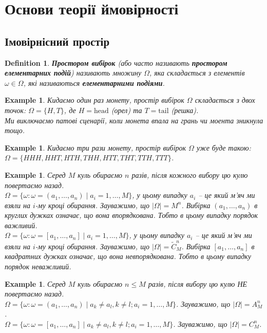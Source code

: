 \documentclass[a4paper, 10pt]{article}
\theoremstyle{theoremdd}
\newtheorem{definition}[theorem]{Definition}
\newtheorem{example}[theorem]{Example}
\begin{document}
%
\tableofcontents
\newpage
    	
\section{Основи теорії ймовірності}
\subsection{Імовірнісний простір}
\begin{definition}
\textbf{Простором вибірок} (або часто називають \textbf{простором елементарних подій}) називають множину $\Omega$, яка складається з елементів $\omega \in \Omega$, які називаються \textbf{елементарними подіями}.
\end{definition}

\begin{example}
Кидаємо один раз монету, простір вибірок $\Omega$ складається з двох точок: $\Omega = \{H, T\}$, де $H = \text{head}$ (орел) та $T = \text{tail}$ (решка). \\
Ми виключаємо патові сценарії, коли монета впала на грань чи моента зникнула тощо.
\end{example}

\begin{example}
Кидаємо три рази монету, простір вибірок $\Omega$ уже буде такою:\\
$\Omega = \{ HHH, HHT, HTH, THH, HTT, THT, TTH, TTT \}$.
\end{example}

\begin{example}
Серед $M$ куль обираємо $n$ разів, після кожного вибору цю кулю повертаємо назад.\\
$\Omega = \{\omega : \omega = (a_1,\dots,a_n) \mid a_i = 1,\dots,M\}$, у цьому випадку $a_i$ -- це який м'яч ми взяли на $i$-му кроці обирання. Зауважимо, що $|\Omega| = M^n$. Вибірка $(a_1,\dots,a_n)$ в круглих дужках означає, що вона впорядкована. Тобто в цьому випадку порядок важливий.\\
$\Omega = \{\omega : \omega = [a_1,\dots,a_n] \mid a_i = 1,\dots,M\}$, у цьому випадку $a_i$ -- це який м'яч ми взяли на $i$-му кроці обирання. Зауважимо, що $|\Omega| = \widetilde{C}_M^n$. Вибірка $[a_1,\dots,a_n]$ в квадратних дужках означає, що вона невпорядкована. Тобто в цьому випадку порядок неважливий.
\end{example}

\begin{example}
Серед $M$ куль обираємо $n \leq M$ разів, після вибору цю кулю НЕ повертаємо назад.\\
$\Omega = \{\omega : \omega = (a_1,\dots,a_n) \mid a_k \neq a_l, k \neq l; a_i = 1,\dots,M\}$. Зауважимо, що $|\Omega| = A_M^n$.\\
$\Omega = \{\omega : \omega = [a_1,\dots,a_n] \mid a_k \neq a_l, k \neq l; a_i = 1,\dots,M\}$. Зауважимо, що $|\Omega| = C_M^n$.
\end{example}
\end{document}
